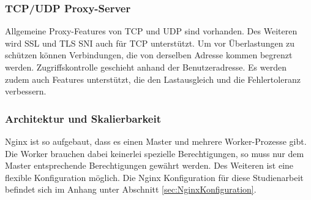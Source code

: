 \subsubsection{TCP/UDP Proxy-Server}
\label{sec:NginxTCP/UDP Proxy-Server}
Allgemeine Proxy-Features von TCP und UDP sind vorhanden. Des Weiteren wird SSL und TLS SNI auch für TCP unterstützt.
Um vor Überlastungen zu schützen können Verbindungen, die von derselben Adresse kommen begrenzt werden. Zugriffskontrolle geschieht anhand der Benutzeradresse. Es werden zudem auch Features unterstützt, die den Lastausgleich und die Fehlertoleranz verbessern.


\subsubsection{Architektur und Skalierbarkeit}
\label{sec:NginxArchitektur und Skalierbarkeit}
Nginx ist so aufgebaut, dass es einen Master und mehrere Worker-Prozesse gibt. Die Worker brauchen dabei keinerlei spezielle Berechtigungen, so muss nur dem Master entsprechende Berechtigungen gewährt werden. Des Weiteren ist eine flexible Konfiguration möglich. Die Nginx Konfiguration für diese Studienarbeit befindet sich im Anhang unter Abschnitt \ref {sec:NginxKonfiguration}.
